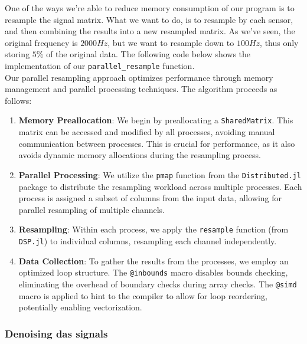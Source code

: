 One of the ways we're able to reduce memory consumption of our program is to resample the signal matrix. What we want to do, is to resample by each sensor, and then combining the results into a new resampled matrix. As we've seen, the original frequency is $2000Hz$, but we want to resample down to $100Hz$, thus only storing $5\%$ of the original data. The following code below shows the implementation of our \texttt{parallel\_resample} function. \\



Our parallel resampling approach optimizes performance through memory management and parallel processing techniques. The algorithm proceeds as follows:

\begin{enumerate}
    \item \textbf{Memory Preallocation}: We begin by preallocating a \texttt{SharedMatrix}. This matrix can be accessed and modified by all processes, avoiding manual communication between processes. This is crucial for performance, as it also avoids dynamic memory allocations during the resampling process.
    \item \textbf{Parallel Processing}: We utilize the \texttt{pmap} function from the \texttt{Distributed.jl} package to distribute the resampling workload across multiple processes. Each process is assigned a subset of columns from the input data, allowing for parallel resampling of multiple channels.
    \item \textbf{Resampling}: Within each process, we apply the \texttt{resample} function (from \texttt{DSP.jl}) to individual columns, resampling each channel independently.
    \item \textbf{Data Collection}: To gather the results from the processes, we employ an optimized loop structure. The \texttt{@inbounds} macro disables bounds checking, eliminating the overhead of boundary checks during array checks. The \texttt{@simd} macro is applied to hint to the compiler to allow for loop reordering, potentially enabling vectorization.
\end{enumerate}



\subsubsection{Denoising \acrshort{das} signals}


